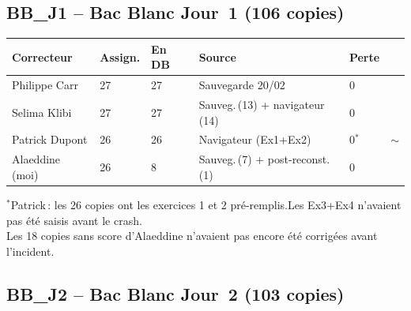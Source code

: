 \documentclass[11pt,a4paper]{article}
\newcommand{\ok}{\textcolor{vertOK}{\textbf{\checkmark}}}
\newcommand{\warn}{\textcolor{orangeW}{\textbf{$\boldsymbol{\sim}$}}}
\begin{document}
\subsection{BB\_J1 -- Bac Blanc Jour~1 (106 copies)}

\begin{center}
	\renewcommand{\arraystretch}{1.5}
	\begin{tabularx}{\linewidth}{L{3.3cm}|C{1.3cm}|C{1.3cm}|L{4cm}|C{0.8cm}|C{0.8cm}|}
		\toprule
		\textbf{\sffamily Correcteur} & \textbf{\sffamily Assign.} & \textbf{\sffamily En DB} & \textbf{\sffamily Source}         & \textbf{\sffamily Perte} &         \\
		\midrule
		Philippe Carr                 & 27                         & 27                       & Sauvegarde 20/02                  & 0                        & \ok{}   \\
		\midrule
		Selima Klibi                  & 27                         & 27                       & Sauveg.\,(13) + navigateur\,(14)  & 0                        & \ok{}   \\
		\midrule
		Patrick Dupont                & 26                         & 26                       & Navigateur (Ex1+Ex2)              & 0$^*$                    & \warn{} \\
		\midrule
		Alaeddine (moi)               & 26                         & 8                        & Sauveg.\,(7) + post-reconst.\,(1) & 0                        & \ok{}   \\
		\bottomrule
	\end{tabularx}
\end{center}

{\small $^*$Patrick\,: les 26 copies ont les exercices 1 et 2 pr\'{e}-remplis.\@ Les Ex3+Ex4 n'avaient pas \'{e}t\'{e} saisis avant le crash.\\
Les 18 copies sans score d'Alaeddine n'avaient pas encore \'{e}t\'{e} corrig\'{e}es avant l'incident.}

\subsection{BB\_J2 -- Bac Blanc Jour~2 (103 copies)}
\end{document}
